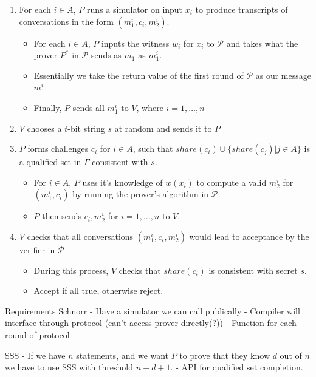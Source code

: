 \begin{enumerate}
    \item For each $i \in \bar A$, $P$ runs a simulator on input $x_i$ to produce transcripts of conversations in the form $(m_1^i, c_i, m_2^i)$.
    \begin{itemize}
        \item For each $i \in A$, $P$ inputs the witness $w_i$ for $x_i$ to $\mathcal P$ and takes what the prover $P^*$ in $\mathcal P$ sends as $m_1$ as $m_1^i$.
        \item Essentially we take the return value of the first round of $\mathcal P$ as our message $m_1^i$.
        \item Finally, $P$ sends all $m_1^i$ to $V$, where $i = 1, \ldots, n$
    \end{itemize}
    \item $V$ chooses a $t$-bit string $s$ at random and sends it to $P$
    \item $P$ forms challenges $c_i$ for $i \in A$, such that $share(c_i) \cup \{share(c_j)|j \in \bar A\}$ is a qualified set in $\Gamma$ consistent with $s$.
    \begin{itemize}
        \item For $i \in A$, $P$ uses it's knowledge of $w(x_i)$ to compute a valid $m_2^i$ for $(m_1^i, c_i)$ by running the prover's algorithm in $\mathcal P$.
        \item $P$ then sends $c_i, m_2^i$ for $i = 1 ,\ldots, n$ to $V$. 
    \end{itemize}
    \item $V$ checks that all conversations $(m_1^i, c_i, m_2^i)$ would lead to acceptance by the verifier in $\mathcal P$
    \begin{itemize}
        \item During this process, $V$ checks that $share(c_i)$ is consistent with secret $s$.
        \item Accept if all true, otherwise reject. 
    \end{itemize}
\end{enumerate}

Requirements
Schnorr
- Have a simulator we can call publically
- Compiler will interface through protocol (can't access prover directly(?))
- Function for each round of protocol

SSS
 - If we have $n$ statements, and we want $P$ to prove that they know $d$ out of $n$ we have to use SSS with threshold $n-d+1$.
 - API for qualified set completion.

